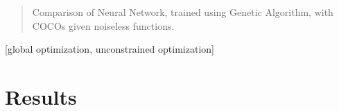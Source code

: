 \documentclass{sig-alternate}
\begin{document}

\maketitle
\begin{abstract}
Comparison of Neural Network, trained using Genetic Algorithm, with COCOs given noiseless functions.
\end{abstract}

[global optimization,
unconstrained optimization]



%
%
%

\section{Results}
\end{document}
